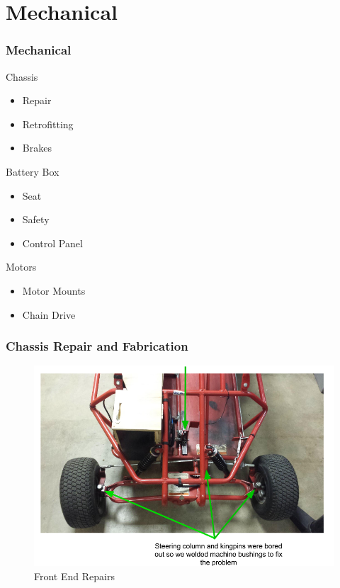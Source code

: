 \documentclass{beamer}
\begin{document}
\section{Mechanical}
\begin{frame}
	\frametitle{Mechanical}
		\begin{block}{Chassis}
			\begin{itemize}
				\item Repair
				\item Retrofitting
				\item Brakes
			\end{itemize}
		\end{block}
		\begin{block}{Battery Box}
			\begin{itemize}
				\item Seat
				\item Safety
				\item Control Panel
			\end{itemize}
		\end{block}
		\begin{block}{Motors}
			\begin{itemize}
				\item Motor Mounts
				\item Chain Drive
			\end{itemize}
		\end{block}		
\end{frame}	
\begin{frame}
	\frametitle{Chassis Repair and Fabrication}
	\begin{figure}
		\centering 
		\includegraphics[scale=.3]{figures/png/SeniorDesignPresentation-1.png}
		\caption{Front End Repairs} 
	\end{figure}	
\end{frame}
\end{document}
